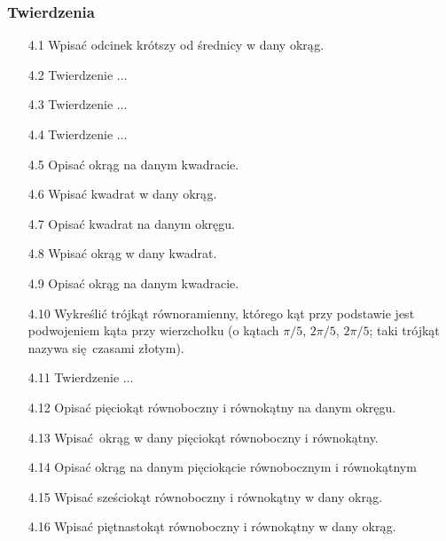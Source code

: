 \subsubsection{Twierdzenia}
\begin{enumerate}
	\item [4.1] Wpisać odcinek krótszy od średnicy w dany okrąg.
	\item [4.2] Twierdzenie ...
	\item [4.3] Twierdzenie ...
	\item [4.4] Twierdzenie ...
	\item [4.5] Opisać okrąg na danym kwadracie.  %
	\item [4.6] Wpisać kwadrat w dany okrąg.
	\item [4.7] Opisać kwadrat na danym okręgu.
	\item [4.8] Wpisać okrąg w dany kwadrat.
	\item [4.9] Opisać okrąg na danym kwadracie.
	\item [4.10] Wykreślić trójkąt równoramienny, którego kąt przy podstawie jest podwojeniem kąta przy wierzchołku (o kątach $\pi/5$, $2\pi/5$, $2\pi/5$; taki trójkąt nazywa się czasami złotym). 
	\item [4.11] Twierdzenie ...
	\item [4.12] Opisać pięciokąt równoboczny i równokątny na danym okręgu. 
	\item [4.13] Wpisać okrąg w dany pięciokąt równoboczny i równokątny.
	\item [4.14] Opisać okrąg na danym pięciokącie równobocznym i równokątnym
	\item [4.15] Wpisać sześciokąt równoboczny i równokątny w dany okrąg.
	\item [4.16] Wpisać piętnastokąt równoboczny i równokątny w dany okrąg.
\end{enumerate}

%